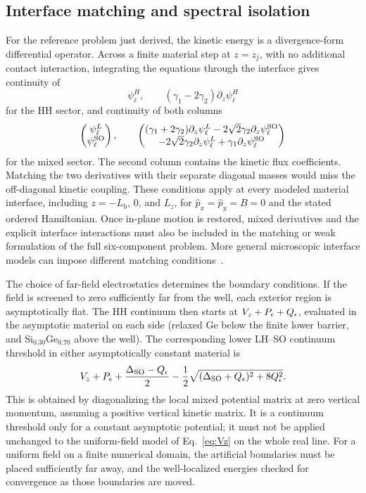 \subsection{Interface matching and spectral isolation}

For the reference problem just derived, the kinetic energy is a divergence-form differential operator. Across a finite material step at $z=z_j$, with no additional contact interaction, integrating the equations through the interface gives continuity of
\begin{equation}
\psi_\ell^H,\qquad
(\gamma_1-2\gamma_2)\partial_z\psi_\ell^H
\label{eq:HHmatching}
\end{equation}
for the HH sector, and continuity of both columns
\begin{equation}
\begin{pmatrix}\psi_\ell^L\\\psi_\ell^{\mathrm{SO}}\end{pmatrix},
\qquad
\begin{pmatrix}
(\gamma_1+2\gamma_2)\partial_z\psi_\ell^L
-2\sqrt2\gamma_2\partial_z\psi_\ell^{\mathrm{SO}}\\
-2\sqrt2\gamma_2\partial_z\psi_\ell^L
+\gamma_1\partial_z\psi_\ell^{\mathrm{SO}}
\end{pmatrix}
\label{eq:LHmatching}
\end{equation}
for the mixed sector. The second column contains the kinetic flux coefficients. Matching the two derivatives with their separate diagonal masses would miss the off-diagonal kinetic coupling. These conditions apply at every modeled material interface, including $z=-L_{\mathrm b}$, $0$, and $L_z$, for $ \hat{p}_ x= \hat{p}_ y=B=0$ and the stated ordered Hamiltonian. Once in-plane motion is restored, mixed derivatives and the explicit interface interactions must also be included in the matching or weak formulation of the full six-component problem. More general microscopic interface models can impose different matching conditions~\cite{foreman,rodina}.

The choice of far-field electrostatics determines the boundary conditions. If the field is screened to zero sufficiently far from the well, each exterior region is asymptotically flat. The HH continuum then starts at $V_z+P_\epsilon+Q_\epsilon$, evaluated in the asymptotic material on each side (relaxed Ge below the finite lower barrier, and Si$_{0.30}$Ge$_{0.70}$ above the well). The corresponding lower LH--SO continuum threshold in either asymptotically constant material is
\begin{equation}
V_z+P_\epsilon+\frac{\Delta_{\mathrm{SO}}-Q_\epsilon}{2}
-\frac12\sqrt{(\Delta_{\mathrm{SO}}+Q_\epsilon)^2+8Q_\epsilon^2}.
\label{eq:mixedthreshold}
\end{equation}
This is obtained by diagonalizing the local mixed potential matrix at zero vertical momentum, assuming a positive vertical kinetic matrix. It is a continuum threshold only for a constant asymptotic potential; it must not be applied unchanged to the uniform-field model of Eq.~\eqref{eq:Vz} on the whole real line. For a uniform field on a finite numerical domain, the artificial boundaries must be placed sufficiently far away, and the well-localized energies checked for convergence as those boundaries are moved.

